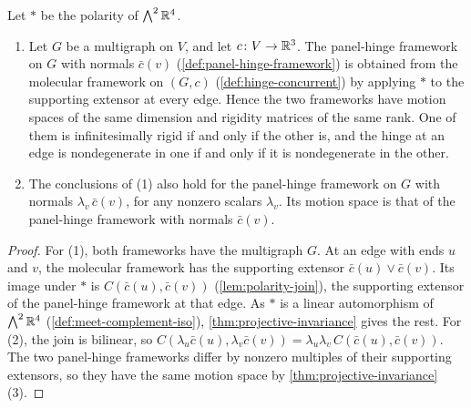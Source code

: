 \begin{lemma}
  \label{lem:panel-hinge-dual-molecular}
  \leanok
  Let $*$ be the polarity of $\bigwedge^2 {\mathbb{R}}^4$.
  \begin{enumerate}
    \item Let $G$ be a multigraph on $V$, and let $c \colon V \to {\mathbb{R}}^3$.
      The panel-hinge framework on $G$ with normals $\bar c(v)$
      (\cref{def:panel-hinge-framework}) is obtained from the molecular
      framework on $(G, c)$ (\cref{def:hinge-concurrent}) by applying
      $*$ to the supporting extensor at every edge. Hence the two
      frameworks have motion spaces of the same dimension and rigidity
      matrices of the same rank. One of them is infinitesimally rigid if
      and only if the other is, and the hinge at an edge is
      nondegenerate in one if and only if it is nondegenerate in the
      other.
    \item The conclusions of (1) also hold for the panel-hinge framework
      on $G$ with normals $\lambda_v\, \bar c(v)$, for any nonzero
      scalars $\lambda_v$. Its motion space is that of the panel-hinge
      framework with normals $\bar c(v)$.
  \end{enumerate}
\end{lemma}
\begin{proof}
  \leanok
  For (1), both frameworks have the multigraph $G$. At an edge with ends
  $u$ and $v$, the molecular framework has the supporting extensor
  $\bar c(u) \vee \bar c(v)$. Its image under $*$ is
  $C(\bar c(u), \bar c(v))$ (\cref{lem:polarity-join}), the supporting
  extensor of the panel-hinge framework at that edge. As $*$ is a linear
  automorphism of
  $\bigwedge^2 {\mathbb{R}}^4$ (\cref{def:meet-complement-iso}),
  \cref{thm:projective-invariance} gives the rest. For (2), the join is
  bilinear, so
  $C(\lambda_u \bar c(u), \lambda_v \bar c(v)) =
  \lambda_u \lambda_v\, C(\bar c(u), \bar c(v))$. The two panel-hinge
  frameworks differ by nonzero multiples of their supporting extensors,
  so they have the same motion space by
  \cref{thm:projective-invariance}(3).
\end{proof}

